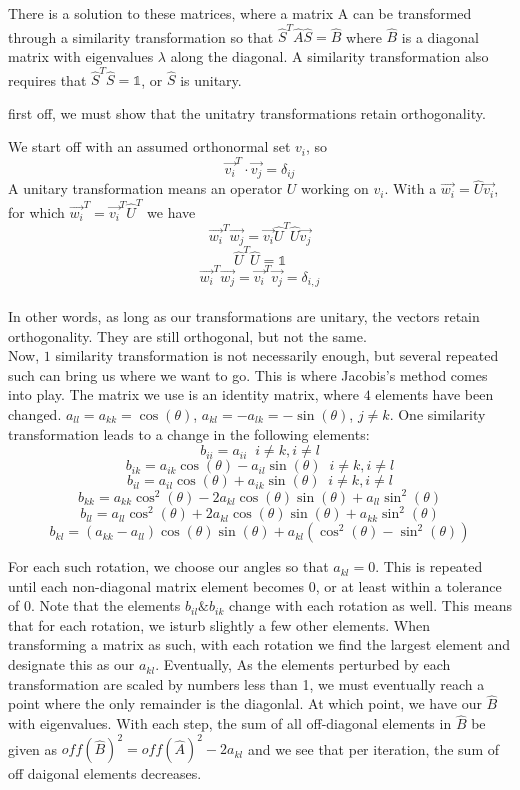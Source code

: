\documentclass[10pt, twocolumn]{article}
\begin{document}
There is a solution to these matrices, where a matrix A can be transformed through a similarity 
transformation so that $\hat{S}^T \hat{A} \hat{S} = \hat{B}$ where $\hat{B}$ is a diagonal matrix 
with eigenvalues $\lambda$ along the diagonal. A similarity transformation also requires that 
$\hat{S}^T\hat{S} = \mathds{1}$, or $\hat{S}$ is unitary. 

first off, we must show that the unitatry transformations retain orthogonality. 

We start off with an assumed orthonormal set $v_i$, so
\[
\vec{v_i}^T \cdot \vec{v_j} = \delta_{ij}
\]
A unitary transformation means an operator $U$ working on $v_i$.
With a $\vec{w_{i}} = \hat{U}\vec{v_{i}}$, for which 
$\vec{w_{i}}^T = \vec{v_{i}}^T\hat{U}^T$ we have 
\[
    \vec{w_{i}}^T\vec{w_{j}} = \vec{v_i} \hat{U}^T \hat{U} \vec{v_j} 
\]
\[
    \hat{U}^T \hat{U} = \mathds{1} 
\]
\[
    \vec{w_i}^T\vec{w_j} = \vec{v_i}^T\vec{v_j} = \delta_{i,j}
\]\\

In other words, as long as our transformations are unitary, the vectors retain 
orthogonality. They are still orthogonal, but not the same. \\

Now, $1$ similarity transformation is not necessarily enough, but several repeated such can 
bring us where we want to go. This is where Jacobis's method comes into play. The matrix we use is
an identity matrix, where $4$ elements have been changed. $a_{ll} = a_{kk} = \cos(\theta)$, 
$a_{kl} = -a_{lk} = -\sin(\theta)$, $j \neq k$. One similarity transformation leads to a change in 
the following elements: 
\[ b_{ii} = a_{ii} \; \; i \neq k, i \neq l \]
\[ b_{ik} = a_{ik}\cos(\theta) - a_{il}\sin(\theta) \; \; i \neq k, i \neq l \]
\[ b_{il} = a_{il}\cos(\theta) + a_{ik}\sin(\theta) \; \; i \neq k, i \neq l \]
\[ b_{kk} = a_{kk}\cos^2(\theta) - 2a_{kl}\cos(\theta)\sin(\theta) + a_{ll}\sin^2(\theta) \]
\[ b_{ll} = a_{ll}\cos^2(\theta) + 2a_{kl}\cos(\theta)\sin(\theta) + a_{kk}\sin^2(\theta) \]
\[ b_{kl} = (a_{kk} - a_{ll})\cos(\theta)\sin(\theta) + a_{kl}(\cos^2(\theta) - \sin^2(\theta)) \]

For each such rotation, we choose our angles so that $a_{kl} = 0$. This is repeated until each non-diagonal
matrix element becomes 0, or at least within a tolerance of 0. Note that the elements $b_{il} \& b_{ik}$
change with each rotation as well. This means that for each rotation, we isturb slightly a few other 
elements. When transforming a matrix as such, with each rotation we find the largest element and designate
this as our $a_{kl}$. Eventually, As the elements perturbed by each transformation are scaled by numbers less
than 1, we must eventually reach a point where the only remainder is the diagonlal. At which point, we have
our $\hat{B}$ with eigenvalues. With each step, the sum of all off-diagonal elements in $\hat{B}$ be given 
as $off(\hat{B})^2 = off(\hat{A})^2 - 2a_{kl}$ and we see that per iteration, the sum of off daigonal elements 
decreases. 
\end{document}
